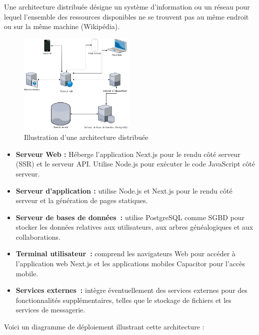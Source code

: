 Une architecture distribuée  désigne un système d'information ou un réseau pour
lequel l'ensemble des ressources disponibles ne se trouvent pas au même endroit
ou sur la même machine (Wikipédia).

\begin{figure}[H]
  \centering
  \includegraphics[width=0.5\textwidth]{figure/schema.png}
  \caption{Illustration d'une architecture distribuée}
\end{figure}

\begin{itemize}
  \item \textbf{ Serveur Web :} Héberge l'application Next.js pour le rendu
    côté serveur (SSR) et le serveur API. Utilise Node.js pour exécuter le
    code JavaScript côté serveur.

  \item \textbf{Serveur d'application :} utilise Node.js et Next.js pour
    le rendu côté serveur et la génération de pages statiques.

  \item \textbf{Serveur de bases de données :} utilise PostgreSQL comme SGBD
    pour stocker les données relatives aux utilisateurs, aux arbres
    généalogiques et aux collaborations.

  \item \textbf{ Terminal utilisateur :} comprend les navigateurs Web pour
    accéder à l’application web Next.js et les applications mobiles Capacitor
    pour l’accès mobile.

  \item \textbf{Services externes :} intègre éventuellement des services
    externes pour des fonctionnalités supplémentaires, telles que
    le stockage de fichiers et les
    services de messagerie.

\end{itemize}

Voici un diagramme de déploiement illustrant cette architecture :

